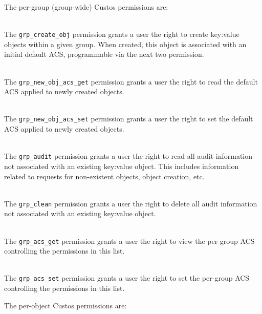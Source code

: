 \noindent
The per-group (group-wide) Custos permissions are:

\begin{packed_desc}
\item[\texttt{grp\_create\_obj}] \hfill \\ The
  \texttt{grp\_create\_obj} permission grants a user the right to
  create key:value objects within a given group. When created, this
  object is associated with an initial default ACS, programmable via
  the next two permission.
\item[\texttt{grp\_new\_obj\_acs\_get}] \hfill \\ The
  \texttt{grp\_new\_obj\_acs\_get} permission grants a user the right
  to read the default ACS applied to newly created objects.
\item[\texttt{grp\_new\_obj\_acs\_set}] \hfill \\ The
  \texttt{grp\_new\_obj\_acs\_set} permission grants a user the right
  to set the default ACS applied to newly created objects.
\item[\texttt{grp\_audit}] \hfill \\ The \texttt{grp\_audit}
  permission grants a user the right to read all audit information not
  associated with an existing key:value object. This includes
  information related to requests for non-existent objects, object
  creation, etc.
\item[\texttt{grp\_clean}] \hfill \\ The \texttt{grp\_clean}
  permission grants a user the right to delete all audit information
  not associated with an existing key:value object.
\item[\texttt{grp\_acs\_get}] \hfill \\ The \texttt{grp\_acs\_get}
  permission grants a user the right to view the per-group ACS
  controlling the permissions in this list.
\item[\texttt{grp\_acs\_set}] \hfill \\ The \texttt{grp\_acs\_set}
  permission grants a user the right to set the per-group ACS
  controlling the permissions in this list.
\end{packed_desc}

\noindent
The per-object Custos permissions are:

